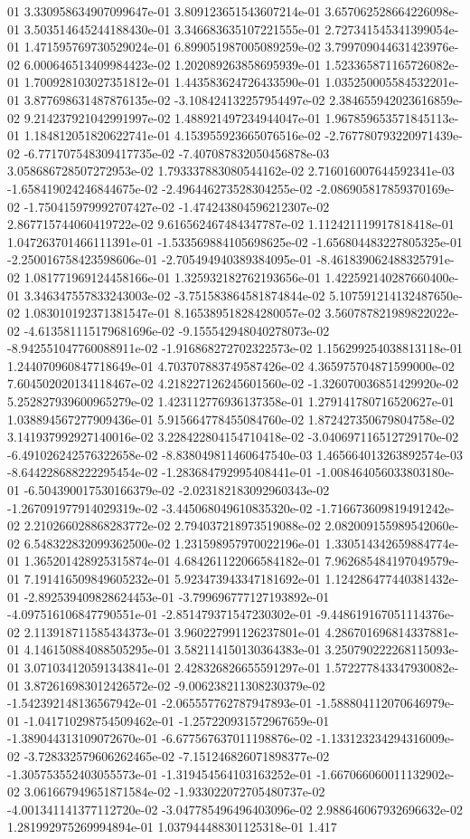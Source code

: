 01	3.330958634907099647e-01	3.809123651543607214e-01	3.657062528664226098e-01	3.503514645244188430e-01	3.346683635107221555e-01	2.727341545341399054e-01	1.471595769730529024e-01	6.899051987005089259e-02	3.799709044631423976e-02	6.000646513409984423e-02	1.202089263858695939e-01	1.523365871165726082e-01	1.700928103027351812e-01	1.443583624726433590e-01	1.035250005584532201e-01	3.877698631487876135e-02	-3.108424132257954497e-02	2.384655942023616859e-02	9.214237921042991997e-02	1.488921497234944047e-01	1.967859653571845113e-01	1.184812051820622741e-01	4.153955923665076516e-02	-2.767780793220971439e-02	-6.771707548309417735e-02	-7.407087832050456878e-03	3.058686728507272953e-02	1.793337883080544162e-02	2.716016007644592341e-03	-1.658419024246844675e-02	-2.496446273528304255e-02	-2.086905817859370169e-02	-1.750415979992707427e-02	-1.474243804596212307e-02	2.867715744060419722e-02	9.616562467484347787e-02	1.112421119917818418e-01	1.047263701466111391e-01	-1.533569884105698625e-02	-1.656804483227805325e-01	-2.250016758423598606e-01	-2.705494940389384095e-01	-8.461839062488325791e-02	1.081771969124458166e-01	1.325932182762193656e-01	1.422592140287660400e-01	3.346347557833243003e-02	-3.751583864581874844e-02	5.107591214132487650e-02	1.083010192371381547e-01	8.165389518284280057e-02	3.560787821989822022e-02	-4.613581115179681696e-02	-9.155542948040278073e-02	-8.942551047760088911e-02	-1.916868272702322573e-02	1.156299254038813118e-01	1.244070960847718649e-01	4.703707883749587426e-02	4.365975704871599000e-02	7.604502020134118467e-02	4.218227126245601560e-02	-1.326070036851429920e-02	5.252827939600965279e-02	1.423112776936137358e-01	1.279141780716520627e-01	1.038894567277909436e-01	5.915664778455084760e-02	1.872427350679804758e-02	3.141937992927140016e-02	3.228422804154710418e-02	-3.040697116512729170e-02	-6.491026242576322658e-02	-8.838049811460647540e-03	1.465664013263892574e-03	-8.644228688222295454e-02	-1.283684792995408441e-01	-1.008464056033803180e-01	-6.504390017530166379e-02	-2.023182183092960343e-02	-1.267091977914029319e-02	-3.445068049610835320e-02	-1.716673609819491242e-02	2.210266028868283772e-02	2.794037218973519088e-02	2.082009155989542060e-02	6.548322832099362500e-02	1.231598957970022196e-01	1.330514342659884774e-01	1.365201428925315874e-01	4.684261122066584182e-01	7.962685484197049579e-01	7.191416509849605232e-01	5.923473943347181692e-01	1.124286477440381432e-01	-2.892539409828624453e-01	-3.799696777127193892e-01	-4.097516106847790551e-01	-2.851479371547230302e-01	-9.448619167051114376e-02	2.113918711585434373e-01	3.960227991126237801e-01	4.286701696814337881e-01	4.146150884088505295e-01	3.582114150130364383e-01	3.250790222268115093e-01	3.071034120591343841e-01	2.428326826655591297e-01	1.572277843347930082e-01	3.872616983012426572e-02	-9.006238211308230379e-02	-1.542392148136567942e-01	-2.065557762787947893e-01	-1.588804112070646979e-01	-1.041710298754509462e-01	-1.257220931572967659e-01	-1.389044313109072670e-01	-6.677567637011198876e-02	-1.133123234294316009e-02	-3.728332579606262465e-02	-7.151246826071898377e-02	-1.305753552403055573e-01	-1.319454564103163252e-01	-1.667066060011132902e-02	3.061667949651871584e-02	-1.933022072705480737e-02	-4.001341141377112720e-02	-3.047785496496403096e-02	2.988646067932696632e-02	1.281992975269994894e-01	1.037944488301125318e-01	1.417